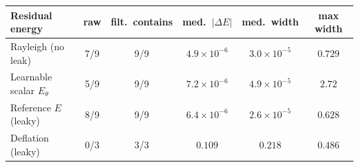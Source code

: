 \setlength{\tabcolsep}{4pt}
\begin{tabular}{lccccc}
\toprule
Residual energy & raw & filt.\ contains & med.\ $|\Delta E|$ & med.\ width & max width \\
\midrule
Rayleigh (no leak) & 7/9 & 9/9 & $4.9\times10^{-6}$ & $3.0\times10^{-5}$ & $0.729$ \\
Learnable scalar $E_\theta$ & 5/9 & 9/9 & $7.2\times10^{-6}$ & $4.9\times10^{-5}$ & $2.72$ \\
Reference $E$ (leaky) & 8/9 & 9/9 & $6.4\times10^{-6}$ & $2.6\times10^{-5}$ & $0.628$ \\
Deflation (leaky) & 0/3 & 3/3 & $0.109$ & $0.218$ & $0.486$ \\
\bottomrule
\end{tabular}
